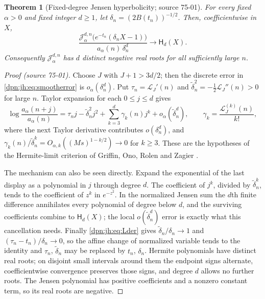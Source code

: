 \documentclass[11pt]{article}
\numberwithin{equation}{section}
\newtheorem{theorem}{Theorem}[section]
\theoremstyle{definition}\newtheorem{definition}[theorem]{Definition}
\theoremstyle{remark}\newtheorem{remark}[theorem]{Remark}
\newcommand{\src}[1]{\textup{(source #1)}}
\begin{document}
\begin{theorem}[Fixed-degree Jensen hyperbolicity; source 75-01]\label{dpn:jh:thm:jensen}
For every fixed $\alpha>0$ and fixed integer $d\ge1$, let
$\delta_n=(2B(t_n))^{-1/2}$.  Then, coefficientwise in $X$,
\begin{equation}\label{dpn:jh:eq:hermite}
 \frac{\mathcal J_\alpha^{d,n}\bigl(e^{-t_n}(\delta_nX-1)\bigr)}{a_\alpha(n)\,\delta_n^d}
 \longrightarrow\mathsf H_d(X).
\end{equation}
Consequently $\mathcal J_\alpha^{d,n}$ has $d$ distinct negative real roots for
all sufficiently large $n$.
\end{theorem}
\begin{proof}[Proof \src{75-01}]
Choose $J$ with $J+1>3d/2$; then the discrete error in
\eqref{dpn:jh:eq:smootherror} is $o_\alpha(\delta_n^d)$.  Put
$\tau_n=\mathcal L_J'(n)$ and $\tilde\delta_n^2=-\tfrac12\mathcal L_J''(n)>0$ for
large $n$.  Taylor expansion for each $0\le j\le d$ gives
\[
 \log\frac{a_\alpha(n+j)}{a_\alpha(n)}
 =\tau_nj-\tilde\delta_n^2j^2+\sum_{k=3}^d\gamma_k(n)j^k+o_\alpha(\tilde\delta_n^d),
 \qquad \gamma_k=\frac{\mathcal L_J^{(k)}(n)}{k!},
\]
where the next Taylor derivative contributes $o(\delta_n^d)$, and
$\gamma_k(n)/\tilde\delta_n^k=O_{\alpha,k}((Ms)^{1-k/2})\to0$ for $k\ge3$.  These
are the hypotheses of the Hermite-limit criterion of Griffin, Ono, Rolen and
Zagier \cite[Theorem~3]{gorz}.

The mechanism can also be seen directly.  Expand the exponential of the last
display as a polynomial in $j$ through degree $d$.  The coefficient of $j^k$,
divided by $\tilde\delta_n^k$, tends to the coefficient of $z^k$ in $e^{-z^2}$.
In the normalized Jensen sum the $d$th finite difference annihilates every
polynomial of degree below $d$, and the surviving coefficients combine to
$\mathsf H_d(X)$; the local $o(\tilde\delta_n^d)$ error is exactly what this
cancellation needs.  Finally \eqref{dpn:jh:eq:Lder} gives
$\tilde\delta_n/\delta_n\to1$ and $(\tau_n-t_n)/\delta_n\to0$, so the affine
change of normalized variable tends to the identity and $\tau_n$,
$\tilde\delta_n$ may be replaced by $t_n$, $\delta_n$.  Hermite polynomials
have distinct real roots; on disjoint small intervals around them the endpoint
signs alternate, coefficientwise convergence preserves those signs, and degree
$d$ allows no further roots.  The Jensen polynomial has positive coefficients
and a nonzero constant term, so its real roots are negative.
\end{proof}
\end{document}
